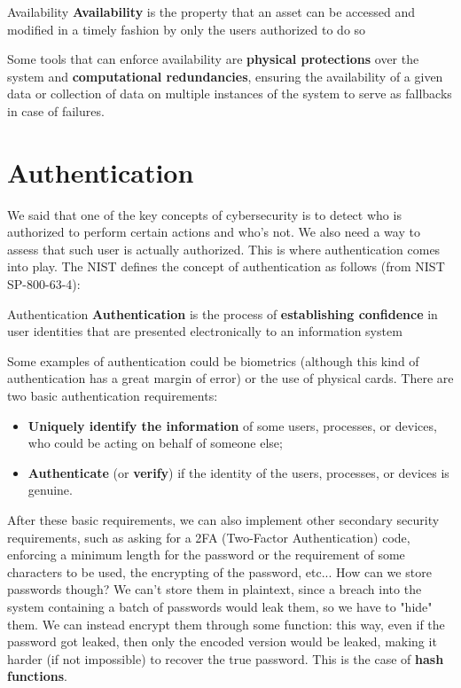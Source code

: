 \begin{definition}{Availability}
    \textbf{Availability} is the property that an asset can be accessed and modified in a timely fashion by only the users authorized to do so
\end{definition}

Some tools that can enforce availability are \textbf{physical protections} over the system and \textbf{computational redundancies}, ensuring the availability of a given data or collection of data on multiple instances of the system to serve as fallbacks in case of failures.


\section{Authentication}

We said that one of the key concepts of cybersecurity is to detect who is authorized to perform certain actions and who's not. We also need a way to assess that such user is actually authorized. This is where authentication comes into play.
\nwl
The NIST defines the concept of authentication as follows (from NIST SP-800-63-4):

\begin{definition}{Authentication}
    \textbf{Authentication} is the process of \textbf{establishing confidence} in user identities that are presented electronically to an information system
\end{definition}

Some examples of authentication could be biometrics (although this kind of authentication has a great margin of error) or the use of physical cards. There are two basic authentication requirements:
\begin{itemize}
    \item \textbf{Uniquely identify the information} of some users, processes, or devices, who could be acting on behalf of someone else;
    \item \textbf{Authenticate} (or \textbf{verify}) if the identity of the users, processes, or devices is genuine.
\end{itemize}
\nwl
After these basic requirements, we can also implement other secondary security requirements, such as asking for a 2FA (Two-Factor Authentication) code, enforcing a minimum length for the password or the requirement of some characters to be used, the encrypting of the password, etc...
\nwl
How can we store passwords though? We can't store them in plaintext, since a breach into the system containing a batch of passwords would leak them, so we have to "hide" them. We can instead encrypt them through some function: this way, even if the password got leaked, then only the encoded version would be leaked, making it harder (if not impossible) to recover the true password. This is the case of \textbf{hash functions}.

